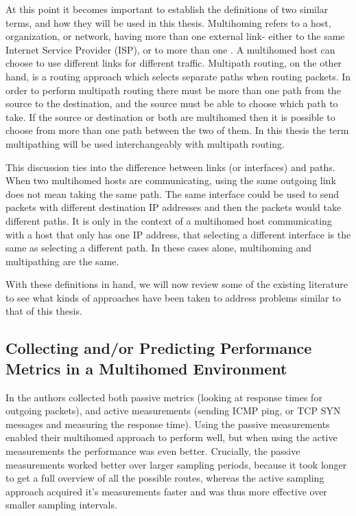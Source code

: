 At this point it becomes important to establish the definitions of two similar terms, and how they will be used in this thesis. Multihoming refers to a host, organization, or network, having more than one external link- either to the same Internet Service Provider (ISP), or to more than one \cite{akella2003measurement}. A multihomed host can choose to use different links for different traffic. Multipath routing, on the other hand, is a routing approach which selects separate paths when routing packets. In order to perform multipath routing there must be more than one path from the source to the destination, and the source must be able to choose which path to take. If the source or destination or both are multihomed then it is possible to choose from more than one path between the two of them. In this thesis the term multipathing will be used interchangeably with multipath routing.

This discussion ties into the difference between links (or interfaces) and paths. When two multihomed hosts are communicating, using the same outgoing link does not mean taking the same path. The same interface could be used to send packets with different destination IP addresses and then the packets would take different paths. It is only in the context of a multihomed host communicating with a host that only has one IP address, that selecting a different interface is the same as selecting a different path. In these cases alone, multihoming and multipathing are the same.

With these definitions in hand, we will now review some of the existing literature to see what kinds of approaches have been taken to address problems similar to that of this thesis.

\subsection{Collecting and/or Predicting Performance Metrics in a Multihomed Environment}

In \cite{akella2008performance} the authors collected both passive metrics (looking at response times for outgoing packets), and active measurements (sending ICMP ping, or TCP SYN messages and measuring the response time). Using the passive measurements enabled their multihomed approach to perform well, but when using the active measurements the performance was even better. Crucially, the passive measurements worked better over larger sampling periods, because it took longer to get a full overview of all the possible routes, whereas the active sampling approach acquired it's measurements faster and was thus more effective over smaller sampling intervals.

